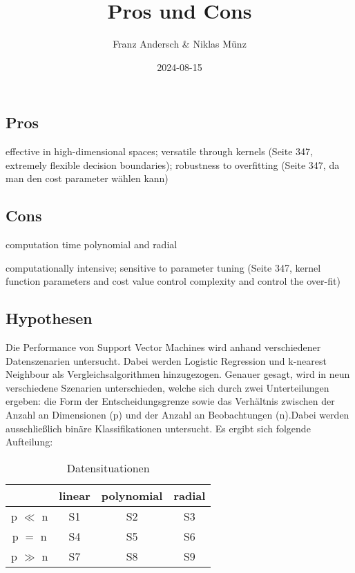 \documentclass[
]{article}
\title{Pros und Cons}
\author{Franz Andersch \& Niklas Münz}
\date{2024-08-15}
\renewcommand{\maketitle}{}
\begin{document}
\maketitle

\subsection{Pros}

effective in high-dimensional spaces; versatile through kernels (Seite
347, extremely flexible decision boundaries); robustness to overfitting
(Seite 347, da man den cost parameter wählen kann)
\parencite{kuhnAppliedPredictiveModeling2013}

\subsection{Cons}

computation time polynomial and radial
\parencite{scholzComparisonClassificationMethods2021}

computationally intensive; sensitive to parameter tuning (Seite 347,
kernel function parameters and cost value control complexity and control
the over-fit) \parencite{kuhnAppliedPredictiveModeling2013}

\subsection{Hypothesen}

Die Performance von Support Vector Machines wird anhand verschiedener
Datenszenarien untersucht. Dabei werden Logistic Regression und
k-nearest Neighbour als Vergleichsalgorithmen hinzugezogen. Genauer
gesagt, wird in neun verschiedene Szenarien unterschieden, welche sich
durch zwei Unterteilungen ergeben: die Form der Entscheidungsgrenze
sowie das Verhältnis zwischen der Anzahl an Dimensionen (p) und der
Anzahl an Beobachtungen (n).Dabei werden ausschließlich binäre
Klassifikationen untersucht. Es ergibt sich folgende Aufteilung:

\begin{table}[h]
\begin{center}
\begin{tabular}{ |c|c|c|c| }
 \hline
  & linear & polynomial & radial \\
 \hline
 p $\ll$ n & S1 & S2 & S3 \\
 \hline
 p $=$ n & S4 & S5 & S6 \\
 \hline
 p $\gg$ n & S7 & S8 & S9 \\
 \hline
\end{tabular}
\end{center}
\caption{Datensituationen}
\label{tab:datensituationen}
\end{table}
\end{document}
